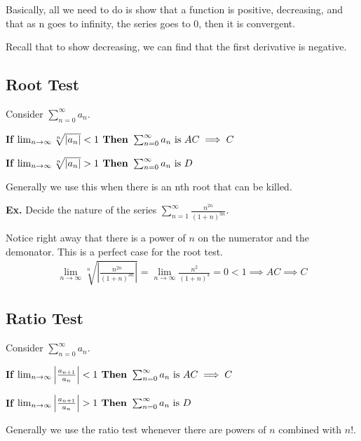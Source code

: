\documentclass[12pt,letterpaper]{article} \usepackage{amsmath} \usepackage{graphicx}  \usepackage{longtable}  \usepackage{amssymb}
\begin{document}
        Basically, all we need to do is show that a function is positive, decreasing, and that as n goes to infinity, the series goes to 0, then it is convergent. 

        Recall that to show decreasing, we can find that the first derivative is negative. 

        \subsection{Root Test}
        Consider $\sum^{\infty}_{n=0}a_n$.
        
        \textbf{If} $\lim_{n\to\infty} \sqrt[n]{|a_n|} < 1 \text{\textbf{ Then }} \sum^{\infty}_{n=0}a_n \text{ is } AC \implies C$

        \textbf{If} $\lim_{n\to\infty} \sqrt[n]{|a_n|} > 1 \text{\textbf{ Then }} \sum^{\infty}_{n=0}a_n \text{ is } D$

        Generally we use this when there is an nth root that can be killed. 

        \begin{mdframed}
            \textbf{Ex.} Decide the nature of the series $\sum^{\infty}_{n=1} \frac{n^{2n}}{(1+n)^{3n}}$.

            Notice right away that there is a power of $n$ on the numerator and the demonator. This is a perfect case for the root test. 
            \begin{align*}
                \lim_{n\to\infty} \sqrt[n]{\left|\frac{n^{2n}}{(1+n)^{3n}}\right|} = \lim_{n\to\infty} \frac{n^2}{(1+n)^3} = 0 < 1 \implies AC \implies C
            \end{align*}
        \end{mdframed}

        \subsection{Ratio Test}
        Consider $\sum^{\infty}_{n=0}a_n$.
        
        \textbf{If} $\lim_{n\to\infty} \left|\frac{a_{n+1}}{a_n} \right| < 1 \text{\textbf{ Then }} \sum^{\infty}_{n=0}a_n \text{ is } AC \implies C$

        \textbf{If} $\lim_{n\to\infty} \left|\frac{a_{n+1}}{a_n} \right| > 1 \text{\textbf{ Then }} \sum^{\infty}_{n=0}a_n \text{ is } D$

        Generally we use the ratio test whenever there are powers of $n$ combined with $n!$.
\end{document}
